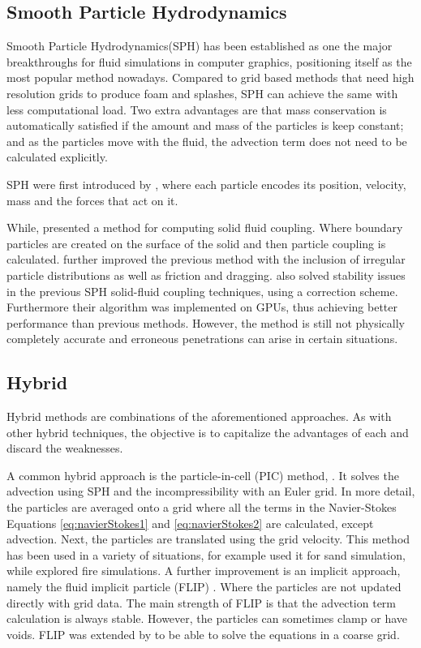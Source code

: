 \subsection{Smooth Particle Hydrodynamics}

Smooth Particle Hydrodynamics(SPH) has been established as one the major breakthroughs for fluid simulations in computer graphics, positioning itself as the most popular method nowadays.
Compared to grid based methods that need high resolution grids to produce foam and splashes, SPH can achieve the same with less computational load.
Two extra advantages are that mass conservation is automatically satisfied if the amount and mass of the particles is keep constant;
and as the particles move with the fluid, the advection term does not need to be calculated explicitly.

SPH were first introduced by \cite{DesbrunMathieuandGascuel1996}, where each particle encodes its position, velocity, mass and the forces that act on it.

While, \cite{Muller2004} presented a method for computing solid fluid coupling. Where boundary particles are created on the surface of the solid and then particle coupling is calculated.
\cite{Akinci2012} further improved the previous method with the inclusion of irregular particle distributions as well as friction and dragging. 
\cite{Shao2014} also solved stability issues in the previous SPH solid-fluid coupling techniques, using a correction scheme.
Furthermore their algorithm was implemented on GPUs, thus achieving better performance than previous methods.  
However, the method is still not physically completely accurate and erroneous penetrations can arise in certain situations. 

\subsection{Hybrid}

Hybrid methods are combinations of the aforementioned approaches.
As with other hybrid techniques, the objective is to capitalize the advantages of each and discard the weaknesses.

A common hybrid approach is the particle-in-cell (PIC) method, \cite{Harlow1962}.
It solves the advection using SPH and the incompressibility with an Euler grid.
In more detail, the particles are averaged onto a grid where all the terms in the Navier-Stokes Equations \ref{eq:navierStokes1} and \ref{eq:navierStokes2} are calculated, except advection.
Next, the particles are translated using the grid velocity.
This method has been used in a variety of situations, for example \cite{Zhu2005} used it for sand simulation, while \cite{Horvath2009} explored fire simulations.
A further improvement is an implicit approach, namely the fluid implicit particle (FLIP) \cite{J.U.Brackbill1986}.
Where the particles are not updated directly with grid data.
The main strength of FLIP is that the advection term calculation is always stable.
However, the particles can sometimes clamp or have voids.
FLIP was extended by \cite{Raveendran2011} to be able to solve the equations in a coarse grid. 

